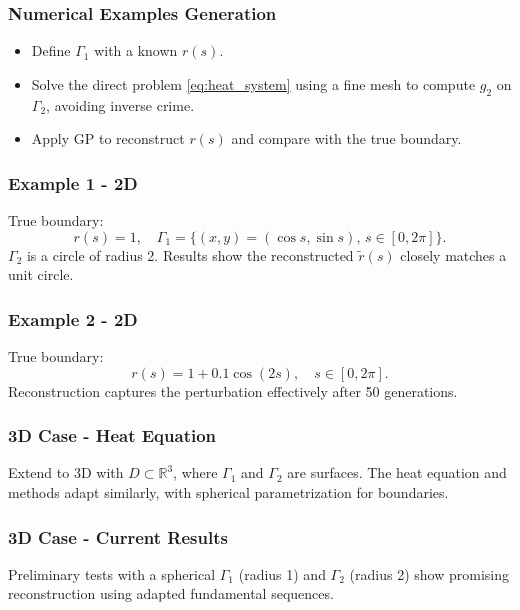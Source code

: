 \documentclass{beamer}
\newcommand{\realnumbers}{\mathbb{R}}
\begin{document}
\begin{frame}
    \frametitle{Numerical Examples Generation}
    \begin{itemize}
        \item Define \( \Gamma_1 \) with a known \( r(s) \).
        \item Solve the direct problem \eqref{eq:heat_system} using a fine mesh to compute \( g_2 \) on \( \Gamma_2 \), avoiding inverse crime.
        \item Apply GP to reconstruct \( r(s) \) and compare with the true boundary.
    \end{itemize}
\end{frame}

\begin{frame}
    \frametitle{Example 1 - 2D}
    True boundary:
    \begin{equation}
        r(s) = 1, \quad \Gamma_1 = \{ (x, y) = (\cos s, \sin s), \, s \in [0, 2\pi] \}.
    \end{equation}
    \( \Gamma_2 \) is a circle of radius 2. Results show the reconstructed \( \tilde{r}(s) \) closely matches a unit circle.
\end{frame}

\begin{frame}
    \frametitle{Example 2 - 2D}
    True boundary:
    \begin{equation}
        r(s) = 1 + 0.1 \cos(2s), \quad s \in [0, 2\pi].
    \end{equation}
    Reconstruction captures the perturbation effectively after 50 generations.
\end{frame}

\begin{frame}
    \frametitle{3D Case - Heat Equation}
    Extend to 3D with \( D \subset \realnumbers^3 \), where \( \Gamma_1 \) and \( \Gamma_2 \) are surfaces. The heat equation and methods adapt similarly, with spherical parametrization for boundaries.
\end{frame}

\begin{frame}
    \frametitle{3D Case - Current Results}
    Preliminary tests with a spherical \( \Gamma_1 \) (radius 1) and \( \Gamma_2 \) (radius 2) show promising reconstruction using adapted fundamental sequences.
\end{frame}
\end{document}
